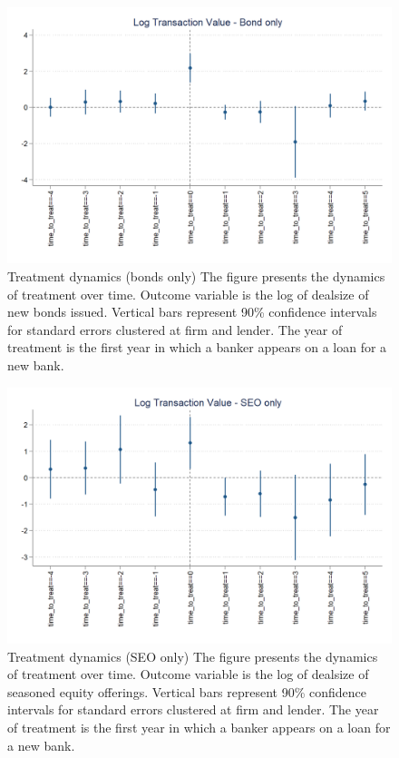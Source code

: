 \begin{figure}[H]
	\caption{Treatment dynamics  (bonds only) \newline
		The figure presents the dynamics of treatment over time. Outcome variable is the log of dealsize of new bonds issued. Vertical bars represent 90\% confidence intervals for standard errors clustered at firm and lender. The year of treatment is the first year in which a banker appears on a loan for a new bank.} 
	\label{fig:dynamics_bonds}
	\centering
	\includegraphics[angle=0,  scale=0.35]{figures/dynamics_logdealsize_bondonly.png}
\end{figure}

\clearpage \newpage



\begin{figure}[H]
	\caption{Treatment dynamics (SEO only) \newline
		The figure presents the dynamics of treatment over time. Outcome variable is the log of dealsize of seasoned equity offerings. Vertical bars represent 90\% confidence intervals for standard errors clustered at firm and lender. The year of treatment is the first year in which a banker appears on a loan for a new bank.} 
	\label{fig:dynamics_seo}
	\centering
	\includegraphics[angle=0,  scale=0.35]{figures/dynamics_logdealsize_seoonly.png}
\end{figure}

